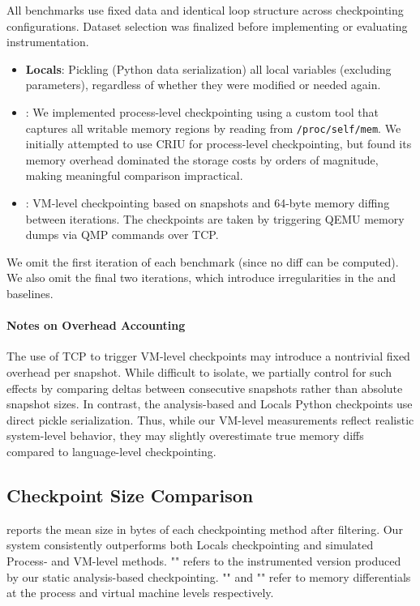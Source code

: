 All benchmarks use fixed data and identical loop structure across checkpointing configurations. Dataset selection was finalized before implementing or evaluating instrumentation.

\begin{itemize}[leftmargin=*]
  \item \textbf{Locals}: Pickling (Python data serialization) all local variables (excluding parameters), regardless of whether they were modified or needed again.
  \item \textbf{\PROCDIFF}: We implemented process-level checkpointing using a custom tool that captures all writable memory regions by reading from \texttt{/proc/self/mem}. We initially attempted to use CRIU for process-level checkpointing, but found its memory overhead dominated the storage costs by orders of magnitude, making meaningful comparison impractical. 
  \item \textbf{\VMDIFF}: VM-level checkpointing based on snapshots and 64-byte memory diffing between iterations. The checkpoints are taken by triggering QEMU memory dumps via QMP commands over TCP.
\end{itemize}

We omit the first iteration of each benchmark (since no diff can be computed). We also omit the final two iterations, which introduce irregularities in the {\PROCDIFF} and {\VMDIFF} baselines.

\paragraph{Notes on Overhead Accounting}
The use of TCP to trigger VM-level checkpoints may introduce a nontrivial fixed overhead per snapshot. While difficult to isolate, we partially control for such effects by comparing deltas between consecutive snapshots rather than absolute snapshot sizes. In contrast, the analysis-based and Locals Python checkpoints use direct pickle serialization. Thus, while our VM-level measurements reflect realistic system-level behavior, they may slightly overestimate true memory diffs compared to language-level checkpointing.

\subsection{Checkpoint Size Comparison}

 reports the mean size in bytes of each checkpointing method after filtering. Our system consistently outperforms both Locals checkpointing and simulated Process- and VM-level methods. "\spyte" refers to the instrumented version produced by our static analysis-based checkpointing. "\PROCDIFF" and "\VMDIFF" refer to memory differentials at the process and virtual machine levels respectively.


